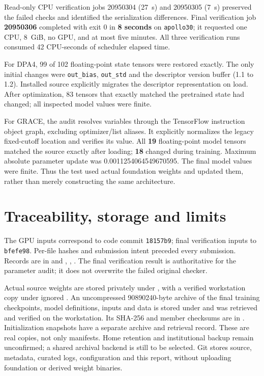 \documentclass[10pt,a4paper]{article}
\begin{document}
Read-only CPU verification jobs 20950304 (27~s) and 20950305 (7~s) preserved the
failed checks and identified the serialization differences. Final verification
job \textbf{20950306} completed with exit 0 in \textbf{8 seconds} on
\texttt{apollo30}; it requested one CPU, 8~GiB, no GPU, and at most five minutes.
All three verification runs consumed 42 CPU-seconds of scheduler elapsed time.

For DPA4, 99 of 102 floating-point state tensors were restored exactly.
The only initial changes were \texttt{out\_bias}, \texttt{out\_std} and the
descriptor version buffer (1.1 to 1.2). Installed source explicitly migrates the
descriptor representation on load. After optimization, 83 tensors that exactly
matched the pretrained state had changed; all inspected model values were finite.

For GRACE, the audit resolves variables through the TensorFlow instruction object
graph, excluding optimizer/list aliases. It explicitly normalizes the legacy
fixed-cutoff location and verifies its value. All \textbf{19} floating-point model
tensors matched the source exactly after loading; \textbf{18} changed during
training. Maximum absolute parameter update was 0.0011254064549670595.
The final model values were finite. Thus the test used actual foundation weights
and updated them, rather than merely constructing the same architecture.

\section{Traceability, storage and limits}
The GPU inputs correspond to code commit \texttt{18157b9}; final verification
inputs to \texttt{bfefe98}. Per-file hashes and submission intent preceded every
submission. Records are in  and
, ,
. The final verification result is authoritative
for the parameter audit; it does not overwrite the failed original checker.

Actual source weights are stored privately under
, with a
verified workstation copy under ignored .
An uncompressed 90890240-byte archive of the final training checkpoints, model
definitions, inputs and data is stored under
 and was retrieved
and verified on the workstation. Its SHA-256 and member checksums are in
.
Initialization snapshots have a separate archive and retrieval record.
These are real copies, not only manifests. Home retention and institutional
backup remain unconfirmed; a shared archival backend is still to be selected.
Git stores source, metadata, curated logs, configuration and this report, without
uploading foundation or derived weight binaries.
\end{document}
